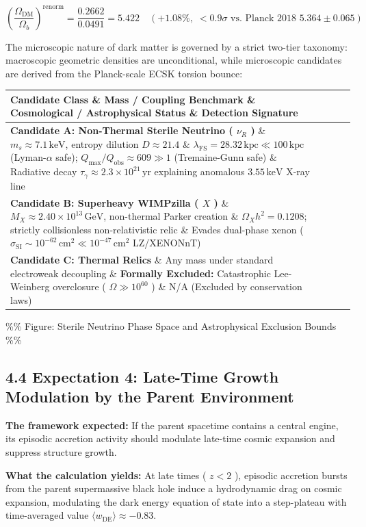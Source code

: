 \documentclass[11pt,a4paper]{article}
\theoremstyle{definition}\newtheorem{definition}{Definition}
\theoremstyle{remark}\newtheorem{remark}{Remark}
\begin{document}
\begin{equation}
\boxed{\left( \frac{\Omega_{\text{DM}}}{\Omega_b} \right)^{\text{renorm}} = \frac{0.2662}{0.0491} = \mathbf{5.422} \quad (+1.08\%, \; < 0.9\sigma \text{ vs. Planck 2018 } 5.364 \pm 0.065)}
\end{equation}


The microscopic nature of dark matter is governed by a strict two-tier taxonomy: macroscopic geometric densities are unconditional, while microscopic candidates are derived from the Planck-scale ECSK torsion bounce:

\begin{longtable}{llll}
\hline
Candidate Class \& Mass / Coupling Benchmark \& Cosmological / Astrophysical Status \& Detection Signature \\
\hline
\textbf{Candidate A: Non-Thermal Sterile Neutrino ( $\nu_R$ )} \& $m_s \approx 7.1\,\text{keV}$, entropy dilution $D \approx 21.4$ \& $\lambda_{\text{FS}} = 28.32\,\text{kpc} \ll 100\,\text{kpc}$ (Lyman-$\alpha$ safe); $Q_{\max}/Q_{\text{obs}} \approx 609 \gg 1$ (Tremaine-Gunn safe) \& Radiative decay $\tau_\gamma \approx 2.3 \times 10^{21}\,\text{yr}$ explaining anomalous $3.55\,\text{keV}$ X-ray line \\
\textbf{Candidate B: Superheavy WIMPzilla ( $X$ )} \& $M_X \approx 2.40 \times 10^{13}\,\text{GeV}$, non-thermal Parker creation \& $\Omega_X h^2 = 0.1208$; strictly collisionless non-relativistic relic \& Evades dual-phase xenon ( $\sigma_{\text{SI}} \sim 10^{-62}\,\text{cm}^2 \ll 10^{-47}\,\text{cm}^2$ LZ/XENONnT) \\
\textbf{Candidate C: Thermal Relics} \& Any mass under standard electroweak decoupling \& \textbf{Formally Excluded:} Catastrophic Lee-Weinberg overclosure ( $\Omega \gg 10^{60}$ ) \& N/A (Excluded by conservation laws) \\
\hline
\end{longtable}
\%\% Figure: Sterile Neutrino Phase Space and Astrophysical Exclusion Bounds \%\%
\subsection{4.4 Expectation 4: Late-Time Growth Modulation by the Parent Environment}

\textbf{The framework expected:} If the parent spacetime contains a central engine, its episodic accretion activity should modulate late-time cosmic expansion and suppress structure growth.

\textbf{What the calculation yields:} At late times ( $z < 2$ ), episodic accretion bursts from the parent supermassive black hole induce a hydrodynamic drag on cosmic expansion, modulating the dark energy equation of state into a step-plateau with time-averaged value $\langle w_{\text{DE}} \rangle \approx -0.83$.
\end{document}
